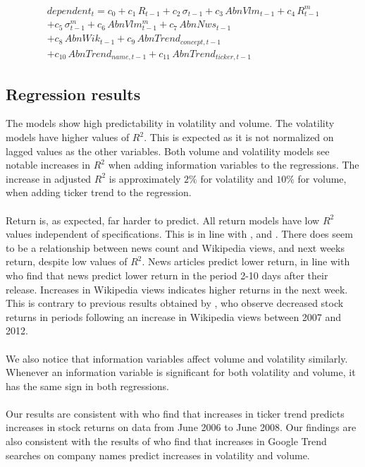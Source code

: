 \begin{equation}
\label{eqAllVariables}
\begin{split}
    dependent_t = c_0 +  c_1\,R_{t-1}+c_2\,\sigma_{t-1}+c_3\,AbnVlm_{t-1}+c_4\,R_{t-1}^m\\
    +c_5\,\sigma_{t-1}^m+c_6\,AbnVlm_{t-1}^m+c_7\,AbnNws_{t-1}\\
    +c_8\,AbnWik_{t-1}+c_9\,AbnTrend_{concept, t-1}\\
    +c_{10}\,AbnTrend_{name, t-1}+c_{11}\,AbnTrend_{ticker, t-1}
\end{split}
\end{equation}

\subsection{Regression results}
The models show high predictability in volatility and volume. The volatility models have higher values of $R^2$. This is expected as it is not normalized on lagged values as the other variables. Both volume and volatility models see notable increases in $R^2$ when adding information variables to the regressions. The increase in adjusted $R^2$ is approximately $2\%$ for volatility and $10\%$ for volume, when adding ticker trend to the regression. 
\\\\
Return is, as expected, far harder to predict. All return models have low $R^2$ values independent of specifications. This is in line with \cite{engelberg}, \cite{neri} and \cite{bijl}. There does seem to be a relationship between news count and Wikipedia views, and next weeks return, despite low values of $R^2$. News articles predict lower return, in line with \cite{aquadi} who find that news predict lower return in the period 2-10 days after their release. Increases in Wikipedia views indicates higher returns in the next week. This is contrary to previous results obtained by \cite{moat}, who observe decreased stock returns in periods following an increase in Wikipedia views between 2007 and 2012.
\\\\
We also notice that information variables affect volume and volatility similarly.  Whenever an information variable is significant for both volatility and volume, it has the same sign in both regressions.
\\\\
Our results are consistent with \cite{engelberg} who find that increases in ticker trend predicts increases in stock returns on data from June 2006 to June 2008. Our findings are also consistent with the results of \cite{vlastakis} who find that increases in Google Trend searches on company names predict increases in volatility and volume. 

